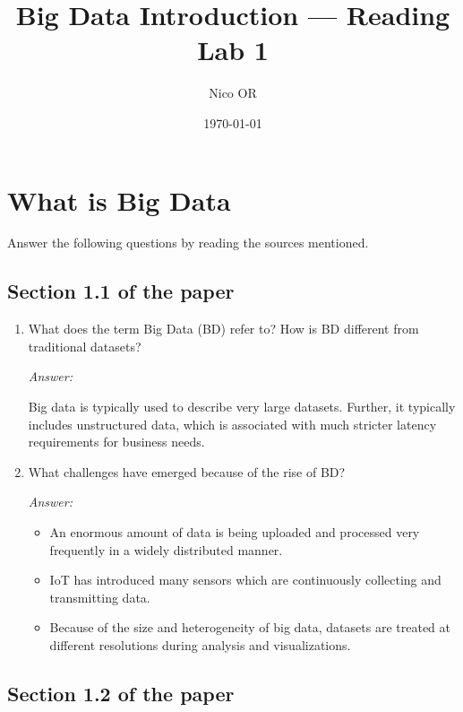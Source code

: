 \documentclass[11pt]{article}
\title{Big Data Introduction --- Reading Lab 1}
\author{Nico OR}
\date{\today}
\newcommand{\answer}{\vspace{0.25em}\par\textit{Answer:}\vspace{0.25em}\par}
\begin{document}
\maketitle

\section{What is Big Data}

Answer the following questions by reading the sources mentioned.

\subsection*{Section 1.1 of the paper}

\begin{enumerate}
  \item What does the term Big Data (BD) refer to? How is BD
    different from traditional datasets?
    \answer Big data is typically used to describe very large
    datasets. Further, it typically includes unstructured data, which
    is associated with much stricter latency requirements for business needs.
  \item What challenges have emerged because of the rise of BD?
    \answer
    \begin{itemize}
      \item An enormous amount of data is being uploaded and
        processed very frequently in a widely distributed manner.
      \item IoT has introduced many sensors which are continuously
        collecting and transmitting data.
      \item Because of the size and heterogeneity of big data,
        datasets are treated at different resolutions during analysis
        and visualizations.
    \end{itemize}
\end{enumerate}

\subsection*{Section 1.2 of the paper}
\end{document}
